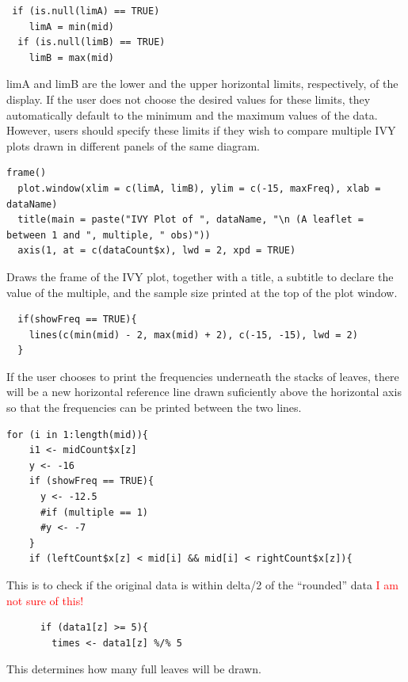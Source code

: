 \begin{verbatim}
 if (is.null(limA) == TRUE)
    limA = min(mid)
  if (is.null(limB) == TRUE)
    limB = max(mid)
\end{verbatim}

limA and limB are the lower and the upper horizontal limits,
respectively, of the display. If the user does not choose the desired
values for these limits, they automatically default to the minimum and
the maximum values of the data. However, users should specify these
limits if they wish to compare multiple IVY plots drawn in different
panels of the same diagram.

\begin{verbatim}
frame()
  plot.window(xlim = c(limA, limB), ylim = c(-15, maxFreq), xlab = dataName)
  title(main = paste("IVY Plot of ", dataName, "\n (A leaflet = between 1 and ", multiple, " obs)"))
  axis(1, at = c(dataCount$x), lwd = 2, xpd = TRUE)
\end{verbatim}

Draws the frame of the IVY plot, together with a title, a subtitle to
declare the value of the multiple, and the sample size printed at the
top of the plot window.

\begin{verbatim}
  if(showFreq == TRUE){
    lines(c(min(mid) - 2, max(mid) + 2), c(-15, -15), lwd = 2)
  }
\end{verbatim}

If the user chooses to print the frequencies underneath the stacks of
leaves, there will be a new horizontal reference line drawn suficiently
above the horizontal axis so that the frequencies can be printed between
the two lines.

\begin{verbatim}
for (i in 1:length(mid)){
    i1 <- midCount$x[z]
    y <- -16
    if (showFreq == TRUE){
      y <- -12.5
      #if (multiple == 1)
      #y <- -7
    }
    if (leftCount$x[z] < mid[i] && mid[i] < rightCount$x[z]){
\end{verbatim}

This is to check if the original data is within delta/2 of the
``rounded'' data \textcolor{red}{I am not sure of this!}

\begin{verbatim}
      if (data1[z] >= 5){
        times <- data1[z] %/% 5
\end{verbatim}

This determines how many full leaves will be drawn.

